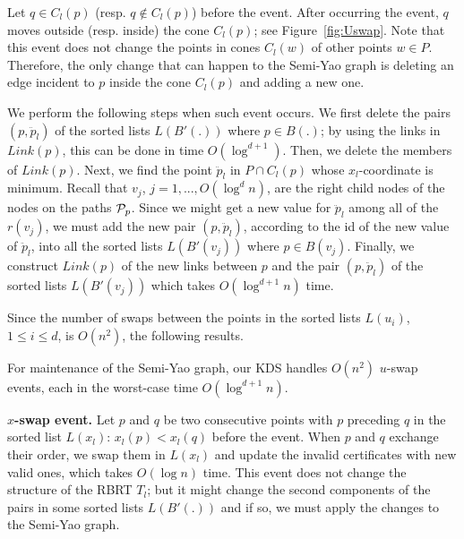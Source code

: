 \documentclass[11pt]{llncs}
\begin{document}
Let $q\in C_l(p)$ (resp. $q\notin C_l(p)$) before the event. After occurring the event, $q$ moves outside (resp. inside) the cone $C_l(p)$; see Figure~\ref{fig:Uswap}. Note that this event does not change the points in cones $C_l(w)$ of other points $w\in P$. Therefore, the only change that can happen to the Semi-Yao graph is deleting an edge incident to $p$ inside the cone $C_l(p)$ and adding a new one. 

We perform the following steps when such event occurs. We first delete the pairs $(p,\ddot{p}_l)$ of the sorted lists $L(B'(.))$ where $p\in B(.)$; by using the links in $Link(p)$, this can be done in time $O(\log^{d+1})$. Then, we delete the members of $Link(p)$. Next, we find the point $\ddot{p}_l$ in $P\cap C_l(p)$ whose $x_l$-coordinate is minimum. Recall that $v_j$, $j=1,...,O(\log^d n)$, are the right child nodes of the nodes on the paths ${\cal P}_p$. Since we might get a new value for $\ddot{p}_l$ among all of the $r(v_j)$, we must add the new pair $(p,\ddot{p}_l)$, according to the id of the new value of $\ddot{p}_l$, into all the sorted lists $L(B'(v_j))$ where $p\in B(v_j)$. Finally, we construct $Link(p)$ of the new links between $p$ and the pair $(p,\ddot{p}_l)$ of the sorted lists $L(B'(v_j))$ which takes $O(\log^{d+1} n)$ time.


Since the number of swaps between the points in the sorted lists $L(u_i)$, $1\leq i \leq d$, is $O(n^2)$, the following results.
\begin{lemma}\label{the:Uswap}
For maintenance of the Semi-Yao graph, our KDS handles $O(n^2)$ $u$-swap events, each in the worst-case time $O(\log^{d+1} n)$.
\end{lemma}
\textbf{$x$-swap event.} Let $p$ and $q$ be two consecutive points with $p$ preceding $q$ in the sorted list $L(x_l)$: $x_l(p)<x_l(q)$ before the event. When $p$ and $q$ exchange their order, we swap them in $L(x_l)$ and update the invalid certificates with new valid ones, which takes $O(\log n)$ time. This event does not change the structure of the RBRT $T_l$; but it might change the second components of the pairs in some sorted lists $L(B'(.))$ and if so, we must apply the changes to the Semi-Yao graph. 
\end{document}
